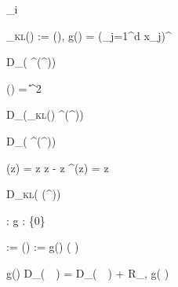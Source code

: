 _i

_{\mbox{\tiny{\textsc{kl}}}}() := \log\left(\right), \qquad
g() = \left(\prod_{j=1}^d x_j\right)^{}


D_\varphi(\,\Vert\,\nabla\varphi^\star(^\top {}))

\varphi() = \|\|^2

D_\varphi(_{\mbox{\tiny{\textsc{kl}}}}()\,\Vert\,\nabla\varphi^\star(^\top {}))

D_\varphi(\,\Vert\,\nabla\varphi^\star(^\top {}))

\varphi(z) = z \log z - z
\varphi^\star(z) = \exp z

D_{\mbox{\tiny{\textsc{kl}}}}(\,\Vert\,\exp(^\top {}))

\varphi:  \rightarrow {}
g :  \rightarrow {}\setminus\{0\}

 := 
\quad{}\quad
\check{\varphi}() :=
g() \cdot {\varphi}\left(  \right)


g() \cdot D_{\varphi}\left(  \,\Vert\,  \right)
= D_{\check{\varphi}}\left(  \,\Vert\, \right)
+ R_{\varphi, g}(\,\Vert\,)
